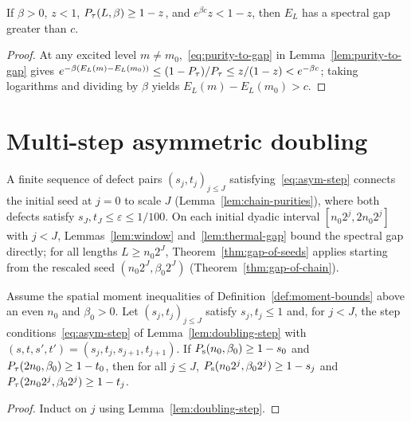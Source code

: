\begin{lemma}
  \label{lem:thermal-gap}
  \leanok
  If \(\beta > 0\), \(z < 1\), \(P_{\tau}(L, \beta) \ge 1 - z\), and \(e^{\beta c} z < 1 - z\), then
  \(E_L\) has a spectral gap greater than \(c\).
\end{lemma}
\begin{proof}
  \leanok
  At any excited level \(m \ne m_0\),~\eqref{eq:purity-to-gap} in Lemma~\ref{lem:purity-to-gap}
  gives \(e^{-\beta (E_L(m) - E_L(m_0))} \le (1 - P_{\tau})/P_{\tau} \le z/(1-z) < e^{-\beta c}\); taking
  logarithms and dividing by \(\beta\) yields \(E_L(m) - E_L(m_0) > c\).
\end{proof}

\section{Multi-step asymmetric doubling}

A finite sequence of defect pairs \((s_j, t_j)_{j \le J}\) satisfying~\eqref{eq:asym-step} connects
the initial seed at \(j = 0\) to scale \(J\) (Lemma~\ref{lem:chain-purities}), where both defects
satisfy \(s_J, t_J \le \varepsilon \le 1/100\). On each initial dyadic interval
\([n_0 2^j, 2n_0 2^j]\) with \(j < J\), Lemmas~\ref{lem:window} and~\ref{lem:thermal-gap} bound the
spectral gap directly; for all lengths \(L \ge n_0 2^J\), Theorem~\ref{thm:gap-of-seeds} applies
starting from the rescaled seed \((n_0 2^J, \beta_0 2^J)\) (Theorem~\ref{thm:gap-of-chain}).

\begin{lemma}
  \label{lem:chain-purities}
  \leanok
  Assume the spatial moment inequalities of Definition~\ref{def:moment-bounds} above an even \(n_0\)
  and \(\beta_0 > 0\). Let \((s_j, t_j)_{j \le J}\) satisfy \(s_j, t_j \le 1\) and, for \(j < J\),
  the step conditions~\eqref{eq:asym-step} of Lemma~\ref{lem:doubling-step} with
  \((s, t, s', t') = (s_j, t_j, s_{j+1}, t_{j+1})\). If \(P_{\mathrm{s}}(n_0, \beta_0) \ge 1 - s_0\) and
  \(P_{\tau}(2n_0, \beta_0) \ge 1 - t_0\), then for all \(j \le J\),
  \(P_{\mathrm{s}}(n_0 2^j, \beta_0 2^j) \ge 1 - s_j\) and \(P_{\tau}(2 n_0 2^j, \beta_0 2^j) \ge 1 - t_j\).
\end{lemma}
\begin{proof}
  \leanok
  Induct on \(j\) using Lemma~\ref{lem:doubling-step}.
\end{proof}

